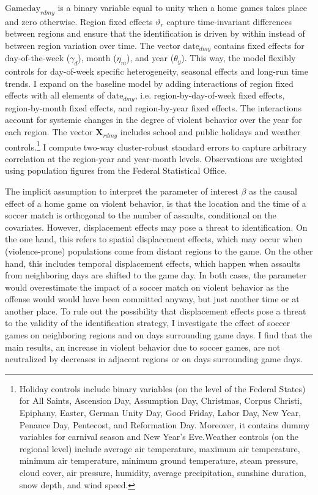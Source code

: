 \documentclass[11pt, a4paper]{article} %
\begin{document}
$\text{Gameday}_{rdmy}$ is a binary variable equal to unity when a home games takes place and zero otherwise. Region fixed effects $\vartheta_r$ capture time-invariant differences between regions and ensure that the identification is driven by within instead of between region variation over time. The vector $\text{date}_{dmy}$ contains fixed effects for day-of-the-week ($\gamma_d$), month ($\eta_m$), and year ($\theta_y$). This way, the model flexibly controls for day-of-week specific heterogeneity, seasonal effects and long-run time trends. I expand on the baseline model by adding interactions of region fixed effects with all elements of $\text{date}_{dmy}$, i.e. region-by-day-of-week fixed effects, region-by-month fixed effects, and region-by-year fixed effects. The interactions account for systemic changes in the degree of violent behavior over the year for each region. The vector $\mathbf{X}_{rdmy}$ includes school and public holidays and weather controls.\footnote{Holiday controls include binary variables (on the level of the Federal States) for All Saints, Ascension Day, Assumption Day, Christmas, Corpus Christi, Epiphany, Easter, German Unity Day, Good Friday, Labor Day, New Year, Penance Day, Pentecost, and Reformation Day. Moreover, it contains dummy variables for carnival season and New Year's Eve.\newline Weather controls (on the regional level) include average air temperature, maximum air temperature, minimum air temperature, minimum ground temperature, steam pressure, cloud cover, air pressure, humidity, average precipitation, sunshine duration, snow depth, and wind speed.} I compute two-way cluster-robust standard errors to capture arbitrary correlation at the region-year and year-month levels. Observations are weighted using population figures from the Federal Statistical Office.


The implicit assumption to interpret the parameter of interest $\beta$ as the causal effect of a home game on violent behavior, is that the location and the time of a soccer match is orthogonal to the number of assaults, conditional on the covariates. However, displacement effects may pose a threat to identification. On the one hand, this refers to spatial displacement effects, which may occur when (violence-prone) populations come from distant regions to the game. On the other hand, this includes temporal displacement effects, which happen when assaults from neighboring days are shifted to the game day. In both cases, the parameter would overestimate the impact of a soccer match on violent behavior as the offense would would have been committed anyway, but just another time or at another place. To rule out the possibility that displacement effects pose a threat to the validity of the identification strategy, I investigate the effect of soccer games on neighboring regions and on days surrounding game days. I find that the main results, an increase in violent behavior due to soccer games, are not neutralized by decreases in adjacent regions or on days surrounding game days.
\end{document}
